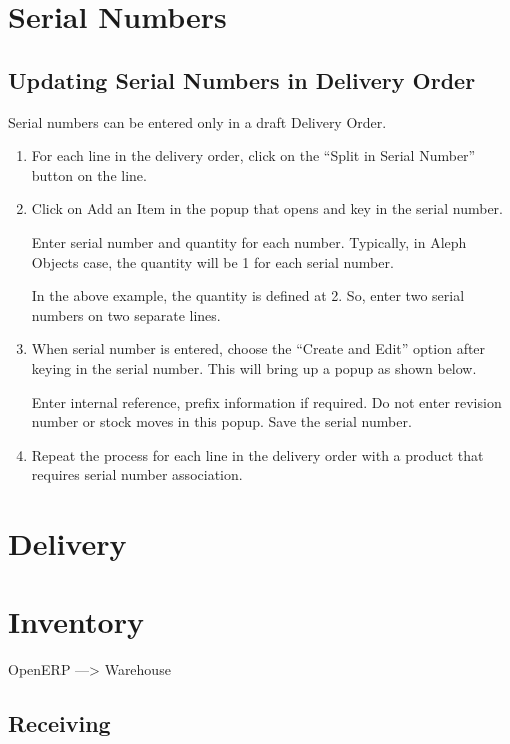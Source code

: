 %
%
%
%
%

\section{Serial Numbers}
\subsection{Updating Serial Numbers in Delivery Order}

Serial numbers can be entered only in a draft Delivery Order. 
\begin{enumerate}
\item For each line in the delivery order, click on the “Split in Serial Number” button on the line.

\item Click on Add an Item in the popup that opens and key in the serial number.

Enter serial number and quantity for each number. Typically, in Aleph Objects case, the quantity will be 1 for each serial number.

In the above example, the quantity is defined at 2. So, enter two serial numbers on two separate lines.
\item When serial number is entered, choose the “Create and Edit” option after keying in the serial number. This will bring up a popup as shown below.

Enter internal reference, prefix information if required.
Do not enter revision number or stock moves in this popup.
Save the serial number.
\item Repeat the process for each line in the delivery order with a product that requires serial number association.
\end{enumerate}

\section{Delivery}

\section{Inventory}
OpenERP ---> Warehouse

\subsection{Receiving}

